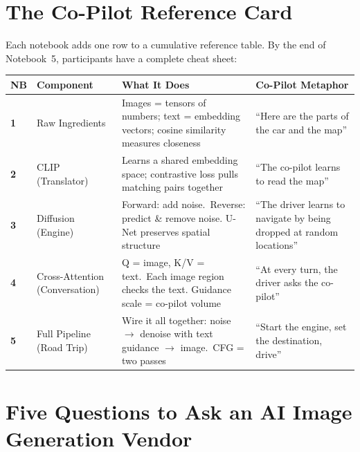 \documentclass[11pt,a4paper]{article}
\begin{document}
\section{The Co-Pilot Reference Card}
\label{sec:reference}

Each notebook adds one row to a cumulative reference table.  By the end
of Notebook~5, participants have a complete cheat sheet:

\begin{center}
\renewcommand{\arraystretch}{1.35}
\small
\begin{tabular}{@{} >{\bfseries}p{0.8cm} p{2.8cm} p{5cm} p{3.5cm} @{}}
\toprule
NB & Component & What It Does & Co-Pilot Metaphor \\
\midrule
1 & Raw Ingredients &
  Images = tensors of numbers; text = embedding vectors;
  cosine similarity measures closeness &
  ``Here are the parts of the car and the map'' \\
2 & CLIP (Translator) &
  Learns a shared embedding space; contrastive loss pulls
  matching pairs together &
  ``The co-pilot learns to read the map'' \\
3 & Diffusion (Engine) &
  Forward: add noise.\ Reverse: predict \& remove noise.
  U-Net preserves spatial structure &
  ``The driver learns to navigate by being dropped at random
  locations'' \\
4 & Cross-Attention (Conversation) &
  Q = image, K/V = text.\ Each image region checks the text.
  Guidance scale = co-pilot volume &
  ``At every turn, the driver asks the co-pilot'' \\
5 & Full Pipeline (Road Trip) &
  Wire it all together: noise $\to$ denoise with text
  guidance $\to$ image.\ CFG = two passes &
  ``Start the engine, set the destination, drive'' \\
\bottomrule
\end{tabular}
\end{center}


\section{Five Questions to Ask an AI Image Generation Vendor}
\label{sec:questions}
\end{document}

